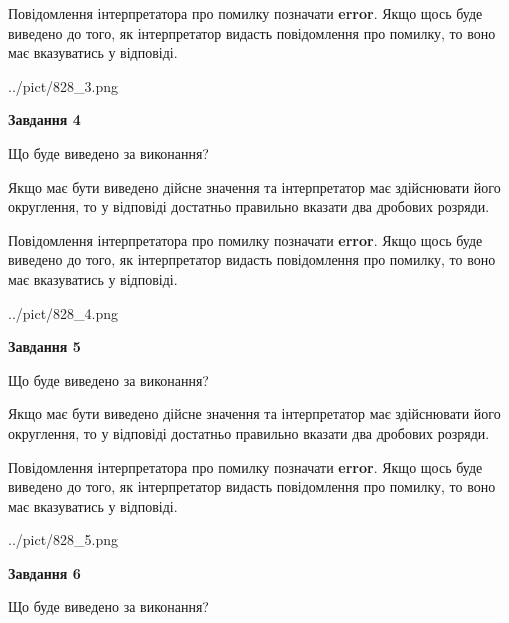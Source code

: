 \documentclass[12pt, ukrainian]{article}
\begin{document}
{\begin {Large}
Повідомлення інтерпретатора про помилку позначати \textbf{error}.
Якщо щось буде виведено до того, як інтерпретатор видасть повідомлення про помилку, 
то воно має вказуватись у відповіді. \par

\begin{center}
	{../pict/828_3.png}
\end{center}
\newpage

{\begin {center}\textbf{Завдання 4}\end {center}}\par
Що буде виведено за виконання? \par

Якщо має бути виведено дійсне значення та інтерпретатор має здійснювати його округлення, 
то у відповіді достатньо правильно вказати два дробових розряди.

Повідомлення інтерпретатора про помилку позначати \textbf{error}.
Якщо щось буде виведено до того, як інтерпретатор видасть повідомлення про помилку, 
то воно має вказуватись у відповіді. \par

\begin{center}
	{../pict/828_4.png}
\end{center}
\newpage

{\begin {center}\textbf{Завдання 5}\end {center}}\par
Що буде виведено за виконання? \par

Якщо має бути виведено дійсне значення та інтерпретатор має здійснювати його округлення, 
то у відповіді достатньо правильно вказати два дробових розряди.

Повідомлення інтерпретатора про помилку позначати \textbf{error}.
Якщо щось буде виведено до того, як інтерпретатор видасть повідомлення про помилку, 
то воно має вказуватись у відповіді. \par

\begin{center}
	{../pict/828_5.png}
\end{center}
\newpage

{\begin {center}\textbf{Завдання 6}\end {center}}\par
Що буде виведено за виконання? \par


\end{Large}}
\end{document}
